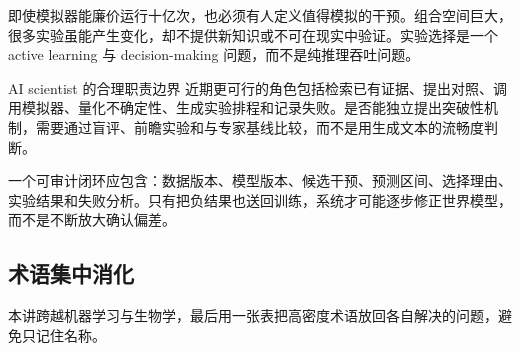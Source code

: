 即使模拟器能廉价运行十亿次，也必须有人定义值得模拟的干预。组合空间巨大，很多实验虽能产生变化，却不提供新知识或不可在现实中验证。实验选择是一个 active learning 与 decision-making 问题，而不是纯推理吞吐问题。



\begin{knowledgebox}{AI scientist 的合理职责边界}
近期更可行的角色包括检索已有证据、提出对照、调用模拟器、量化不确定性、生成实验排程和记录失败。是否能独立提出突破性机制，需要通过盲评、前瞻实验和与专家基线比较，而不是用生成文本的流畅度判断。
\end{knowledgebox}

一个可审计闭环应包含：数据版本、模型版本、候选干预、预测区间、选择理由、实验结果和失败分析。只有把负结果也送回训练，系统才可能逐步修正世界模型，而不是不断放大确认偏差。

\subsection{术语集中消化}

本讲跨越机器学习与生物学，最后用一张表把高密度术语放回各自解决的问题，避免只记住名称。

